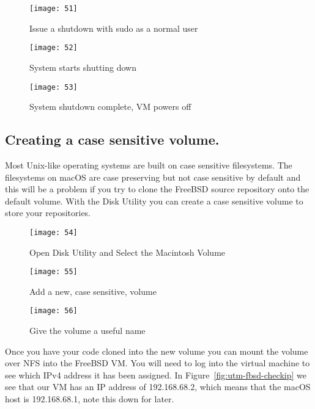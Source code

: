 \begin{figure}
  \centering
\texttt{[image: 51]}
  \caption{Issue a shutdown with sudo as a normal user}
  \label{fig:utm-fbsd-shutdown}
\end{figure}

\begin{figure}
  \centering
\texttt{[image: 52]}
  \caption{System starts shutting down}
  \label{fig:utm-fbsd-shutdown-start}
\end{figure}

\begin{figure}
  \centering
\texttt{[image: 53]}
  \caption{System shutdown complete, VM powers off}
  \label{fig:utm-fbsd-shutdown-done}
\end{figure}

\subsection{Creating a case sensitive volume.}
\label{sec:case-sensitive}

Most Unix-like operating systems are built on case sensitive
filesystems.  The filesystems on macOS are case preserving but not
case sensitive by default and this will be a problem if you try to
clone the FreeBSD source repository onto the default volume.  With the
Disk Utility you can create a case sensitive volume to store your
repositories.

\begin{figure}
  \centering
\texttt{[image: 54]}
  \caption{Open Disk Utility and Select the Macintosh Volume}
  \label{fig:utm-mac-diskutil}
\end{figure}

\begin{figure}
  \centering
\texttt{[image: 55]}
  \caption{Add a new, case sensitive, volume}
  \label{fig:utm-mac-case}
\end{figure}

\begin{figure}
  \centering
\texttt{[image: 56]}
  \caption{Give the volume a useful name}
  \label{fig:utm-mac-name}
\end{figure}

Once you have your code cloned into the new volume you can mount the
volume over NFS into the FreeBSD VM.  You will need to log into the
virtual machine to see which IPv4 address it has been assigned.  In
Figure~\ref{fig:utm-fbsd-checkip} we see that our VM has an IP address
of 192.168.68.2, which means that the macOS host is 192.168.68.1, note
this down for later.

